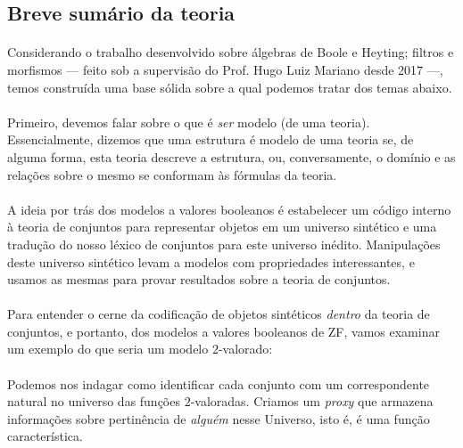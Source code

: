 \documentclass[12pt]{article}
\begin{document}
        \subsection{Breve sumário da teoria}
        \paragraph{}
            Considerando o trabalho desenvolvido sobre álgebras de Boole e Heyting; filtros e morfismos ---
            feito sob a supervisão do Prof. Hugo Luiz Mariano desde 2017 ---, temos 
            construída uma base sólida sobre a qual podemos tratar dos temas abaixo.
        \paragraph{}
            Primeiro, devemos falar sobre o que é {\em ser} modelo (de uma teoria). 
            Essencialmente, dizemos que uma estrutura é modelo de uma teoria se, de alguma forma,
            esta teoria descreve a estrutura, ou, conversamente, o domínio e as relações sobre o mesmo
            se conformam às fórmulas da teoria.
        \paragraph{}
            A ideia por trás dos modelos a valores booleanos é estabelecer um código interno à 
            teoria de conjuntos para representar objetos em um universo sintético e uma tradução 
            do nosso léxico de conjuntos para este universo inédito. Manipulações deste universo
            sintético levam a modelos com propriedades interessantes, e usamos as mesmas para 
            provar resultados sobre a teoria de conjuntos.
        \paragraph{} 
            Para entender o cerne da codificação de objetos sintéticos {\em dentro} da teoria 
            de conjuntos, e portanto, dos modelos a valores booleanos de {\sc ZF}, vamos 
            examinar um exemplo do que seria um modelo $2$-valorado:
        \paragraph{}
            Podemos nos indagar como identificar cada conjunto com um correspondente natural 
            no universo das funções $2$-valoradas. Criamos um {\em proxy} que armazena 
            informações sobre pertinência de {\em alguém} nesse Universo, isto é, é uma 
            função característica.
\end{document}
